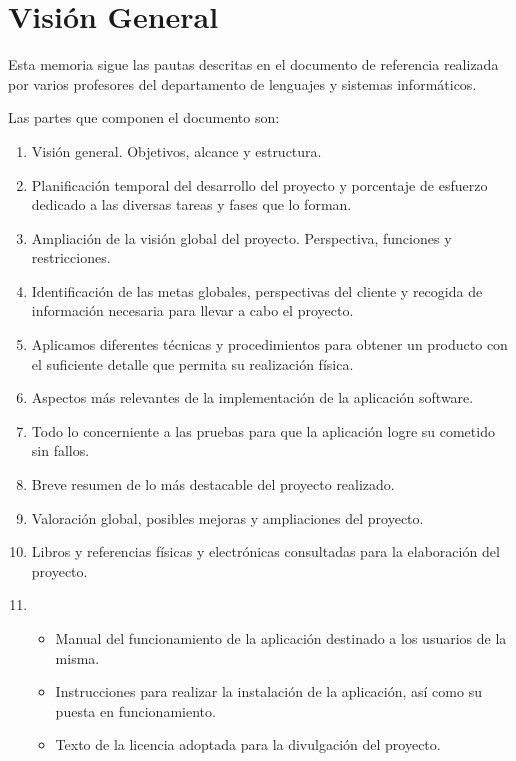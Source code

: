 \section{Visión General}
Esta memoria sigue las pautas descritas en el documento de referencia
 realizada por varios profesores del departamento de
lenguajes y sistemas informáticos.

Las partes que componen el documento son:

\begin{enumerate}
  \item {} Visión general. Objetivos, alcance y
    estructura.
  \item {} Planificación temporal del
    desarrollo del proyecto y porcentaje de esfuerzo dedicado a las
    diversas tareas y fases que lo forman.
  \item {} Ampliación de la
    visión global del proyecto. Perspectiva, funciones y
    restricciones.
  \item {} Identificación de las metas globales,
    perspectivas del cliente y recogida de información necesaria para
    llevar a cabo el proyecto.
  \item {} Aplicamos diferentes técnicas y
    procedimientos para obtener un producto con el suficiente detalle
    que permita su realización física.
  \item {} Aspectos más relevantes de la
    implementación de la aplicación software.
  \item {} Todo lo concerniente a las pruebas para
    que la aplicación logre su cometido sin fallos.
  \item {} Breve resumen de lo más destacable del
    proyecto realizado.
  \item {} Valoración global, posibles mejoras y
    ampliaciones del proyecto.
  \item {} Libros y referencias físicas y
    electrónicas consultadas para la elaboración del proyecto.
  \item {}
    \begin{itemize}
      \item {} Manual del funcionamiento de la
        aplicación destinado a los usuarios de la misma.
      \item {} Instrucciones para realizar la instalación de
        la aplicación, así como su puesta en funcionamiento.
      \item {} Texto de la licencia adoptada para la
        divulgación del proyecto.
    \end{itemize}
\end{enumerate}